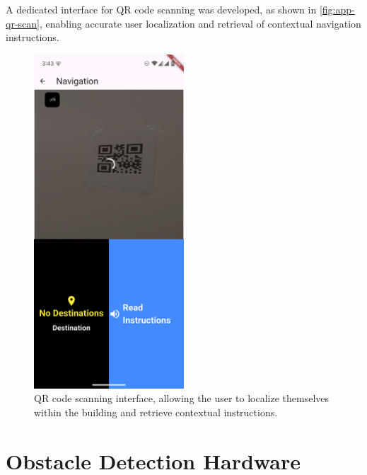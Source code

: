 A dedicated interface for QR code scanning was developed, as shown in \autoref{fig:app-qr-scan}, enabling accurate user localization and retrieval of contextual navigation instructions.
\begin{figure}[h]
	\centering
	\includegraphics[width=0.5\textwidth]{assets/ch5_imp/mobile_app_navscreen.png}
	\caption{QR code scanning interface, allowing the user to localize themselves within the building and retrieve contextual instructions.}
	\label{fig:app-qr-scan}
\end{figure}

\section{Obstacle Detection Hardware}

